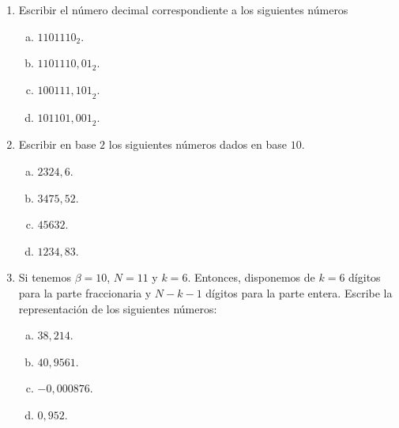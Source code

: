 \documentclass{beamer}
\newcounter{savedenum}
\newcommand*{\saveenum}{\setcounter{savedenum}{\theenumi}}
\begin{document}
\begin{frame}

	\begin{enumerate}
		\item Escribir el número decimal correspondiente a los siguientes números
		      \begin{multicols}{2}
			      \begin{enumerate}[a)]
				      \item ${1101110}_{2}$.
				      \item $1101110,01_{2}$.
				      \item ${100111,101}_{2}$.
				      \item ${101101,001}_{2}$.
			      \end{enumerate}
		      \end{multicols}
		\item Escribir en base $2$ los siguientes números dados en base $10$.
		      \begin{multicols}{2}
			      \begin{enumerate}[a)]
				      \item $2324,6$.
				      \item $3475,52$.
				      \item $45632$.
				      \item $1234,83$.
			      \end{enumerate}
		      \end{multicols}
		\item Si tenemos $\beta=10$, $N=11$ y $k=6$. Entonces, disponemos de $k=6$ dígitos para la parte fraccionaria y $N-k-1$ dígitos para la parte entera. Escribe la representación de los siguientes números:
		      \begin{multicols}{2}
			      \begin{enumerate}[a)]
				      \item $38,214$.
				      \item $40,9561$.
				      \item $-0,000876$.
				      \item $0,952$.
			      \end{enumerate}
		      \end{multicols}
		      \saveenum
	\end{enumerate}
\end{frame}
\end{document}
